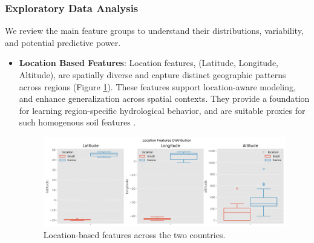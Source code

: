 \documentclass[ruler]{CUP-JNL-EDS}%
\begin{document}
\subsubsection{Exploratory Data Analysis}
We review the main feature groups to understand their distributions, variability, and potential predictive power.

\begin{itemize}
    \item{\textbf{Location Based Features}}: Location features, (Latitude, Longitude, Altitude), are spatially diverse 
    and capture distinct geographic patterns across regions (Figure \ref{fig:location_based_features}). These features 
    support location-aware modeling,  and enhance generalization across spatial contexts. They provide a foundation for 
    learning region-specific hydrological behavior, and are suitable proxies for such homogenous soil features 
    \citep{arsenault2023}.
    \begin{figure}[htbp]
        \includegraphics[width=1.0\textwidth]{./assets/images/location_features_distribution.png}
        \caption{Location-based features across the two countries.}
        \label{fig:location_based_features}
    \end{figure}
    \vspace{3mm}


\end{itemize}
\end{document}
